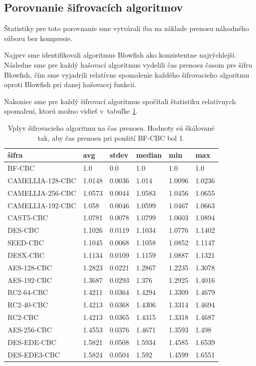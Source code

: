 \documentclass[12pt,a4paper]{article}
\begin{document}
\subsection{Porovnanie šifrovacích algoritmov}
\label{sec:cipher-comparison}

Štatistiky pre toto porovnanie sme vytvárali iba na základe prenosu
náhodného súboru bez kompresie.

Najprv sme identifikovali algoritmus Blowfish ako konzistentne
najrýchlejší. Následne sme pre každý hašovací algoritmus vydelili čas
prenosu časom pre šifru Blowfish, čím sme vyjadrili relatívne spomalenie
každého šifrovacieho algoritmu oproti Blowfish pri danej hašovacej funkcii.

Nakoniec sme pre každý šifrovací algoritmus spočítali štatistiku
relatívnych spomalení, ktorú možno vidieť v~tabuľke
\ref{tbl:cipher-comparison}.

\begin{table}\centering
    \caption{Vplyv šifrovacieho algoritmu na čas prenosu. Hodnoty sú
    škálované tak, aby čas prenosu pri použití BF-CBC bol 1.}
    \label{tbl:cipher-comparison}
   \begin{tabular}{|l||l|l|l|l|l|}
        \hline
        \bf šifra & \bf  avg & \bf stdev & \bf median & \bf min & \bf max \\ \hline 
        BF-CBC & 1.0 & 0.0 & 1.0 & 1.0 & 1.0\\ \hline
        CAMELLIA-128-CBC & 1.0148 & 0.0036 & 1.014 & 1.0096 & 1.0236 \\ \hline
        CAMELLIA-256-CBC & 1.0573 & 0.0044 & 1.0583 & 1.0456 & 1.0655 \\ \hline
        CAMELLIA-192-CBC & 1.058 & 0.0046 & 1.0599 & 1.0467 & 1.0663 \\ \hline
        CAST5-CBC & 1.0781 & 0.0078 & 1.0799 & 1.0603 & 1.0894 \\ \hline
        DES-CBC & 1.1026 & 0.0119 & 1.1034 & 1.0776 & 1.1402 \\ \hline
        SEED-CBC & 1.1045 & 0.0068 & 1.1058 & 1.0852 & 1.1147 \\ \hline
        DESX-CBC & 1.1134 & 0.0109 & 1.1159 & 1.0887 & 1.1321 \\ \hline
        AES-128-CBC & 1.2823 & 0.0221 & 1.2867 & 1.2235 & 1.3078 \\ \hline
        AES-192-CBC & 1.3687 & 0.0293 & 1.376 & 1.2925 & 1.4016 \\ \hline
        RC2-64-CBC & 1.4211 & 0.0364 & 1.4294 & 1.3309 & 1.4679 \\ \hline
        RC2-40-CBC & 1.4213 & 0.0368 & 1.4306 & 1.3314 & 1.4694 \\ \hline
        RC2-CBC & 1.4213 & 0.0365 & 1.4315 & 1.3318 & 1.4687 \\ \hline
        AES-256-CBC & 1.4553 & 0.0376 & 1.4671 & 1.3593 & 1.498 \\ \hline
        DES-EDE-CBC & 1.5821 & 0.0508 & 1.5934 & 1.4585 & 1.6539 \\ \hline
        DES-EDE3-CBC & 1.5824 & 0.0504 & 1.592 & 1.4599 & 1.6551 \\ \hline
    \end{tabular}
\end{table}
\end{document}
